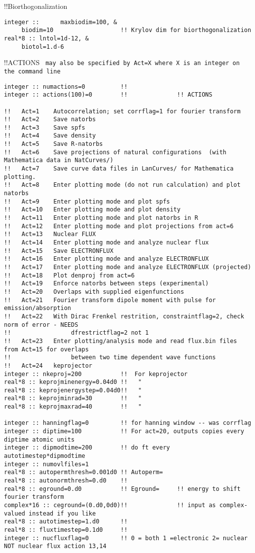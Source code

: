 !!{\large \quad Biorthogonalization }
\begin{verbatim}
integer ::      maxbiodim=100, &
     biodim=10                   !! Krylov dim for biorthogonalization
real*8 :: lntol=1d-12, &
     biotol=1.d-6
\end{verbatim} 
!!{\large \quad ACTIONS} \verb# may also be specified by Act=X where X is an integer on the command line #
\begin{verbatim}
integer :: numactions=0          !! 
integer :: actions(100)=0        !!              !! ACTIONS

!!   Act=1    Autocorrelation; set corrflag=1 for fourier transform
!!   Act=2    Save natorbs
!!   Act=3    Save spfs
!!   Act=4    Save density
!!   Act=5    Save R-natorbs
!!   Act=6    Save projections of natural configurations  (with Mathematica data in NatCurves/)
!!   Act=7    Save curve data files in LanCurves/ for Mathematica plotting.
!!   Act=8    Enter plotting mode (do not run calculation) and plot natorbs 
!!   Act=9    Enter plotting mode and plot spfs
!!   Act=10   Enter plotting mode and plot density
!!   Act=11   Enter plotting mode and plot natorbs in R
!!   Act=12   Enter plotting mode and plot projections from act=6
!!   Act=13   Nuclear FLUX 
!!   Act=14   Enter plotting mode and analyze nuclear flux
!!   Act=15   Save ELECTRONFLUX
!!   Act=16   Enter plotting mode and analyze ELECTRONFLUX 
!!   Act=17   Enter plotting mode and analyze ELECTRONFLUX (projected)
!!   Act=18   Plot denproj from act=6
!!   Act=19   Enforce natorbs between steps (experimental)
!!   Act=20   Overlaps with supplied eigenfunctions
!!   Act=21   Fourier transform dipole moment with pulse for emission/absorption
!!   Act=22   With Dirac Frenkel restrition, constraintflag=2, check norm of error - NEEDS
!!                 dfrestrictflag=2 not 1
!!   Act=23   Enter plotting/analysis mode and read flux.bin files from Act=15 for overlaps
!!                 between two time dependent wave functions
!!   Act=24   keprojector
integer :: nkeproj=200           !!  For keprojector
real*8 :: keprojminenergy=0.04d0 !!   "
real*8 :: keprojenergystep=0.04d0!!   "
real*8 :: keprojminrad=30        !!   "
real*8 :: keprojmaxrad=40        !!   "

integer :: hanningflag=0         !! for hanning window -- was corrflag
integer :: diptime=100           !! For act=20, outputs copies every diptime atomic units
integer :: dipmodtime=200        !! do ft every autotimestep*dipmodtime
integer :: numovlfiles=1
real*8 :: autopermthresh=0.001d0 !! Autoperm=
real*8 :: autonormthresh=0.d0    !! 
real*8 :: eground=0.d0           !! Eground=     !! energy to shift fourier transform 
complex*16 :: ceground=(0.d0,0d0)!!              !! input as complex-valued instead if you like
real*8 :: autotimestep=1.d0      !!
real*8 :: fluxtimestep=0.1d0     !!
integer :: nucfluxflag=0         !! 0 = both 1 =electronic 2= nuclear  NOT nuclear flux action 13,14
\end{verbatim}
